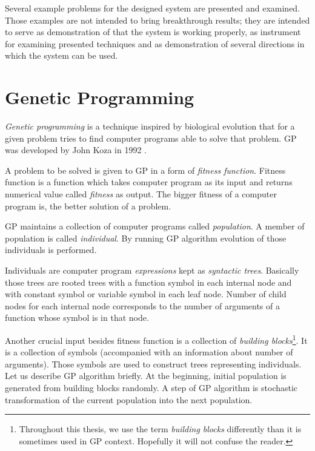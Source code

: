 \documentclass[12pt,a4paper]{report}
\newcommand{\Lets}{Let us\xspace}
\begin{document}
Several example problems for the designed system are presented 
and examined. Those examples are not intended to 
bring breakthrough results; they are intended to 
serve as demonstration of that the system is working properly,
as instrument for examining presented techniques and 
as demonstration of several directions in which the system
can be used.      


\chapter{Genetic Programming}
\label{GP}

\textit{Genetic programming} is a technique inspired by biological evolution
that for a given problem tries to find computer programs able to solve that problem. 
GP was developed by John Koza in 1992 \cite{koza92}.

A problem to be solved is given to GP in a form of \textit{fitness function}. 
Fitness function is a function which takes computer program as its input and 
returns numerical value called \textit{fitness} as output. 
The bigger fitness of a computer program is, the better solution of a problem.

GP maintains a collection of computer programs called \textit{population}. 
A member of population is called \textit{individual}. 
By running GP algorithm evolution of those individuals is performed.

Individuals are computer program \textit{expressions} kept as \textit{syntactic trees}. 
Basically those trees are rooted trees with a function symbol in each internal node 
and with constant symbol or variable symbol in each leaf node. 
Number of child nodes for each internal node corresponds to the number of arguments of a function whose symbol is in that node.

Another crucial input besides fitness function is a collection of 
\textit{building blocks}\footnote{Throughout this thesis, 
we use the term \textit{building blocks} 
differently than it is sometimes used in GP context. 
Hopefully it will not confuse the reader.}.
It is a collection of symbols (accompanied with an information about number of arguments).
Those symbols are used to construct trees representing individuals.\\

\Lets describe GP algorithm briefly.
At the beginning, initial population is generated from building blocks randomly.
A step of GP algorithm is stochastic transformation of the current population into 	
the next population.
\end{document}
